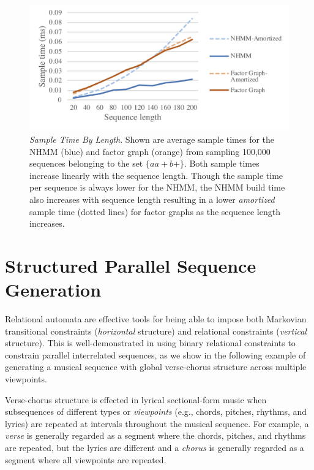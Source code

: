 \documentclass[phd,electronic,oneside,twosidetoc,letterpaper,chaptercenter,parttop,lof,lot]{byumsphd}
\begin{document}
\begin{figure}
    \centering
    \includegraphics[width=\linewidth]{sampleTimeByLengthlegend}
    \caption{\textit{Sample Time By Length}. Shown are average sample times for the NHMM (blue) and factor graph (orange) from sampling 100,000 sequences belonging to the set $\{aa+b+\}$. Both sample times increase linearly with the sequence length. Though the sample time per sequence is always lower for the NHMM, the NHMM build time also increases with sequence length resulting in a lower \emph{amortized} sample time (dotted lines) for factor graphs as the sequence length increases.}
    \label{fig:sampleTimeByLength}
\end{figure}

\section{Structured Parallel Sequence Generation}

{\sc Relational} automata are effective tools for being able to impose both Markovian transitional constraints (\emph{horizontal} structure) and relational constraints (\emph{vertical} structure). This is well-demonstrated in using binary relational constraints to constrain parallel interrelated sequences, as we show in the following example of generating a musical sequence with global verse-chorus structure across multiple viewpoints. 

Verse-chorus structure is effected in lyrical sectional-form music when subsequences of different types or \textit{viewpoints} (e.g., chords, pitches, rhythms, and lyrics) are repeated at intervals throughout the musical sequence. For example, a \textit{verse} is generally regarded as a segment where the chords, pitches, and rhythms are repeated, but the lyrics are different and a \textit{chorus} is generally regarded as a segment where all viewpoints are repeated.
\end{document}
